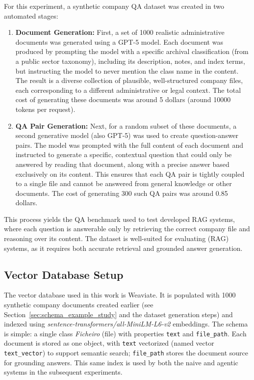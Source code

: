 For this experiment, a synthetic company QA dataset was created in two automated stages:
\begin{enumerate}
        \item \textbf{Document Generation:} First, a set of 1000 realistic administrative documents was generated using a \gls{GPT}-5 model. Each document was produced by prompting the model with a specific archival classification (from a public sector taxonomy), including its description, notes, and index terms, but instructing the model to never mention the class name in the content. The result is a diverse collection of plausible, well-structured company files, each corresponding to a different administrative or legal context. The total cost of generating these documents was around 5 dollars (around 10000 tokens per request).
        \item \textbf{QA Pair Generation:} \label{subsec:qa-generation} Next, for a random subset of these documents, a second generative model (also \gls{GPT}-5) was used to create question-answer pairs. The model was prompted with the full content of each document and instructed to generate a specific, contextual question that could only be answered by reading that document, along with a precise answer based exclusively on its content. This ensures that each QA pair is tightly coupled to a single file and cannot be answered from general knowledge or other documents. The cost of generating 300 such QA pairs was around 0.85 dollars.
\end{enumerate}

This process yields the \gls{QA} benchmark used to test developed \gls{RAG} systems, where each question is answerable only by retrieving the correct company file and reasoning over its content. The dataset is well-suited for evaluating (\gls{RAG}) systems, as it requires both accurate retrieval and grounded answer generation.

\subsection{Vector Database Setup}
The vector database used in this work is Weaviate. It is populated with 1000 synthetic company documents created earlier (see Section~\ref{sec:schema_example_study} and the dataset generation steps) and indexed using \textit{sentence-transformers/all-MiniLM-L6-v2} embeddings. The schema is simple: a single class \textit{Ficheiro} (file) with properties \texttt{text} and \texttt{file\_path}. Each document is stored as one object, with \texttt{text} vectorized (named vector \texttt{text\_vector}) to support semantic search; \texttt{file\_path} stores the document source for grounding answers. This same index is used by both the naive and agentic systems in the subsequent experiments.

